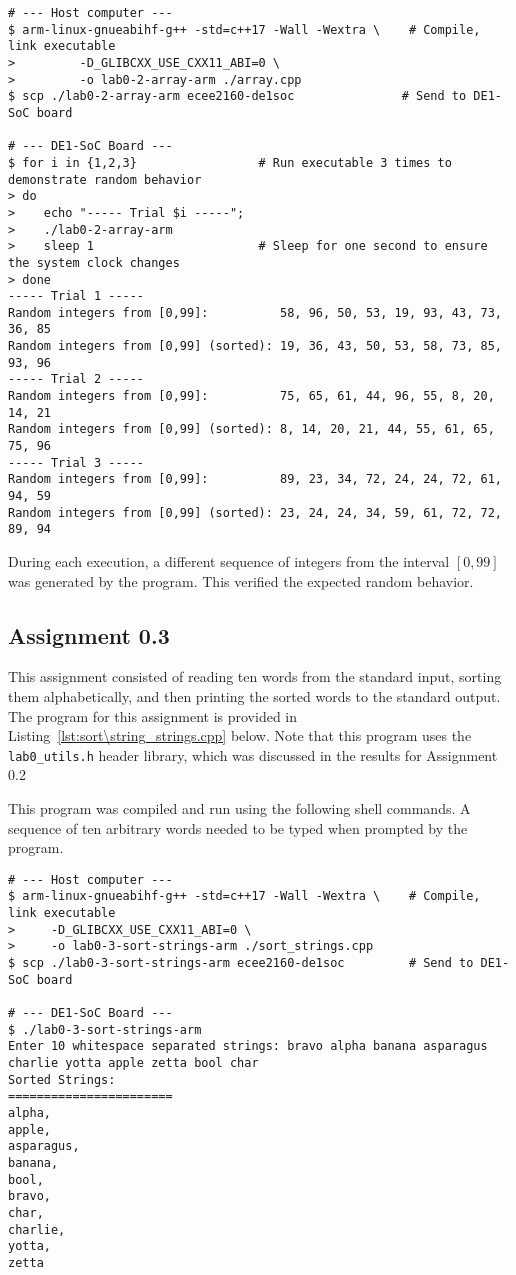 \documentclass[11pt, letterpaper]{article} %
\begin{document}
\begin{lstlisting}[style=labreportstyle-sh]
# --- Host computer ---
$ arm-linux-gnueabihf-g++ -std=c++17 -Wall -Wextra \    # Compile, link executable
>         -D_GLIBCXX_USE_CXX11_ABI=0 \
>         -o lab0-2-array-arm ./array.cpp
$ scp ./lab0-2-array-arm ecee2160-de1soc               # Send to DE1-SoC board

# --- DE1-SoC Board ---
$ for i in {1,2,3}                 # Run executable 3 times to demonstrate random behavior
> do 
>    echo "----- Trial $i -----";
>    ./lab0-2-array-arm
>    sleep 1                       # Sleep for one second to ensure the system clock changes
> done
----- Trial 1 -----
Random integers from [0,99]:          58, 96, 50, 53, 19, 93, 43, 73, 36, 85
Random integers from [0,99] (sorted): 19, 36, 43, 50, 53, 58, 73, 85, 93, 96
----- Trial 2 -----
Random integers from [0,99]:          75, 65, 61, 44, 96, 55, 8, 20, 14, 21
Random integers from [0,99] (sorted): 8, 14, 20, 21, 44, 55, 61, 65, 75, 96
----- Trial 3 -----
Random integers from [0,99]:          89, 23, 34, 72, 24, 24, 72, 61, 94, 59
Random integers from [0,99] (sorted): 23, 24, 24, 34, 59, 61, 72, 72, 89, 94
\end{lstlisting}

During each execution, a different sequence of integers from the interval $[0,99]$ was generated by the program. This verified the expected random behavior.

\subsection*{Assignment 0.3}

This assignment consisted of reading ten words from the standard input, sorting them alphabetically, and then printing the sorted words to the standard output. The program for this assignment is provided in Listing~\ref{lst:sort\string_strings.cpp} below. Note that this program uses the \texttt{lab0\string_utils.h} header library, which was discussed in the results for Assignment 0.2


This program was compiled and run using the following shell commands. A sequence of ten arbitrary words needed to be typed when prompted by the program.

\begin{lstlisting}[style=labreportstyle-sh]
# --- Host computer ---
$ arm-linux-gnueabihf-g++ -std=c++17 -Wall -Wextra \    # Compile, link executable
>     -D_GLIBCXX_USE_CXX11_ABI=0 \
>     -o lab0-3-sort-strings-arm ./sort_strings.cpp
$ scp ./lab0-3-sort-strings-arm ecee2160-de1soc         # Send to DE1-SoC board

# --- DE1-SoC Board ---
$ ./lab0-3-sort-strings-arm
Enter 10 whitespace separated strings: bravo alpha banana asparagus charlie yotta apple zetta bool char
Sorted Strings:
=======================
alpha,
apple,
asparagus,
banana,
bool,
bravo,
char,
charlie,
yotta,
zetta

\end{lstlisting}
\end{document}
